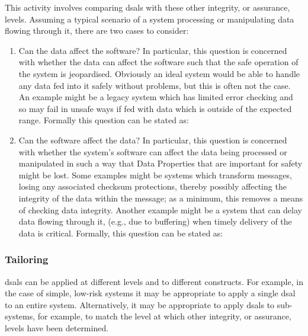 This activity involves comparing \glspl{dsal} with these other \gls{integrity}, or assurance, levels. Assuming a typical scenario of a system processing or manipulating data flowing through it, there are two cases to consider:

\begin{enumerate}
  \item Can the data affect the software? In particular, this question is concerned with whether the data can affect the software such that the safe operation of the system is jeopardised. Obviously an ideal system would be able to handle any data fed into it safely without problems, but this is often not the case. An example might be a legacy system which has limited error checking and so may fail in unsafe ways if fed with data which is outside of the expected range. Formally this question can be stated as: 
  \item Can the software affect the data? In particular, this question is concerned with whether the system's software can affect the data being processed or manipulated in such a way that Data Properties that are important for safety might be lost. Some examples might be systems which transform messages, losing any associated checksum protections, thereby possibly affecting the \gls{integrity} of the data within the message; as a minimum, this removes a means of checking data \gls{integrity}. Another example might be a system that can delay data flowing through it, (e.g., due to buffering) when timely delivery of the data is critical. Formally, this question can be stated as: 
\end{enumerate}

\subsubsection{Tailoring}\label{bkm:activities:analyse:tailoring}
\glspl{dsal} can be applied at different levels and to different constructs. For example, in the case of simple, low-risk systems it may be appropriate to apply a single \gls{dsal} to an entire system. Alternatively, it may be appropriate to apply \glspl{dsal} to sub-systems, for example, to match the level at which other \gls{integrity}, or assurance, levels have been determined. 

